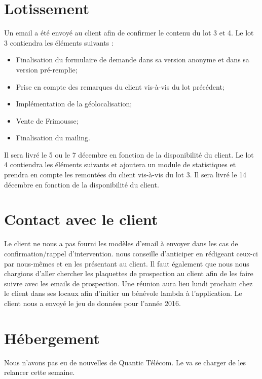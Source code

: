 \documentclass [a4paper] {article}
\begin{document}
\section{Lotissement}
	Un email a été envoyé au client afin de confirmer le contenu du lot 3 et 4. 
Le lot 3 contiendra les éléments suivants :
\begin{itemize}
	\item Finalisation du formulaire de demande dans sa version anonyme et dans sa version pré-remplie;
	\item Prise en compte des remarques du client vis-à-vis du lot précédent;
	\item Implémentation de la géolocalisation;
	\item Vente de Frimousse;
	\item Finalisation du mailing.
\end{itemize} Il sera livré le 5 ou le 7 décembre en fonction de la disponibilité du client.
Le lot 4 contiendra les éléments suivants et ajoutera un module de statistiques et prendra en compte les remontées du client vis-à-vis du lot 3.
Il sera livré le 14 décembre en fonction de la disponibilité du client.

\section{Contact avec le client}
Le client ne nous a pas fourni les modèles d'email à envoyer dans les cas de confirmation/rappel d'intervention. \nomTuteurPedago{} nous conseille d'anticiper en rédigeant ceux-ci par nous-mêmes et en les présentant au client. Il faut également que nous nous chargions d'aller chercher les plaquettes de prospection au client afin de les faire suivre avec les emails de prospection. 
Une réunion aura lieu lundi prochain chez le client dans ses locaux afin d'initier un bénévole lambda à l'application.
Le client nous a envoyé le jeu de données pour l'année 2016.

\section{Hébergement}
Nous n'avons pas eu de nouvelles de Quantic Télécom. Le \CP{} va se charger de les relancer cette semaine.
\newpage
\end{document}
